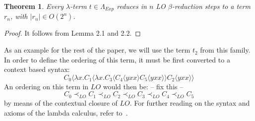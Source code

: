 \documentclass[12pt]{article}
\newtheorem{theorem}{Theorem}[section]
\begin{document}
\begin{theorem}
Every $\lambda$-term $t \in \Lambda_{Exp}$ reduces in $n$ LO $\beta$-reduction steps to a term $r_n$, with $|r_n| \in O(2^n)$.
\end{theorem}
\begin{proof}
It follows from Lemma 2.1 and 2.2.
\end{proof}

As an example for the rest of the paper, we will use the term $t_{2}$ from this family. In order to define the ordering of this term, it must be first converted to a context based syntax:
\[ C_{0} \langle \lambda x. C_{1} \langle \lambda x. C_{3} \langle C_{4} \langle yxx \rangle C_{5} \langle yxx \rangle \rangle C_{2} \langle yxx \rangle \rangle \]
An ordering on this term in $LO$ would then be: -- fix this --
\begin{equation}
 C_{0} \prec_{LO} C_{1} \prec_{LO} C_{2} \prec_{LO} C_{3} \prec_{LO} C_{4} \prec_{LO} C_{5}
\end{equation}
by means of the contextual closure of $LO$.
For further reading on the syntax and axioms of the lambda calculus, refer to~\cite{barendregt1984lambda}.
\end{document}
